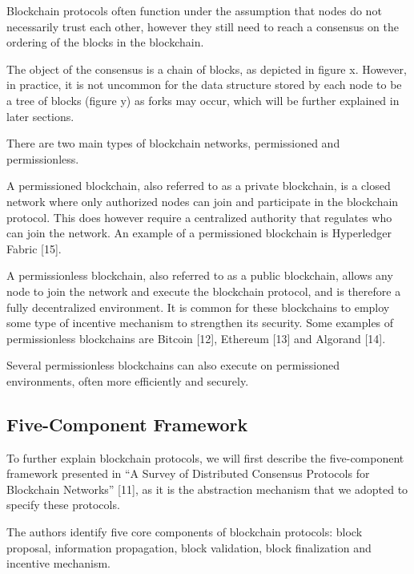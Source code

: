 Blockchain protocols often function under the assumption that nodes do not necessarily trust each other, however they still need to reach a consensus on the ordering of the blocks in the blockchain.

The object of the consensus is a chain of blocks, as depicted in figure x. However, in practice, it is not uncommon for the data structure stored by each node to be a tree of blocks (figure y) as forks may occur, which will be further explained in later sections.


\vspace{0.5cm}

There are two main types of blockchain networks, permissioned and permissionless.

A permissioned blockchain, also referred to as a private blockchain, is a closed network where only authorized nodes can join and participate in the blockchain protocol. This does however require a centralized authority that regulates who can join the network. An example of a permissioned blockchain is Hyperledger Fabric [15].

A permissionless blockchain, also referred to as a public blockchain, allows any node to join the network and execute the blockchain protocol, and is therefore a fully decentralized environment. It is common for these blockchains to employ some type of incentive mechanism to strengthen its security. Some examples of permissionless blockchains are Bitcoin [12], Ethereum [13] and Algorand [14].

Several permissionless blockchains can also execute on permissioned environments, often more efficiently and securely.

\subsection{Five-Component Framework}

To further explain blockchain protocols, we will first describe the five-component framework presented in “A Survey of Distributed Consensus Protocols for Blockchain Networks” [11], as it is the abstraction mechanism that we adopted to specify these protocols.

The authors identify five core components of blockchain protocols: block proposal, information propagation, block validation, block finalization and incentive mechanism.

\vspace{0.5cm}


